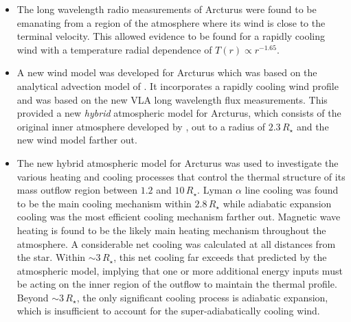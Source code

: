 \begin{itemize}
	\item The long wavelength radio measurements of Arcturus were found to be emanating from a region of the atmosphere where its wind is close to the terminal velocity. This allowed evidence to be found for a rapidly cooling wind with a temperature radial dependence of $T(r) \propto r^{-1.65}$.
	
	\item A new wind model was developed for Arcturus which was based on the analytical advection model of \cite{glassgold_1986}. It incorporates a rapidly cooling wind profile and was based on the new VLA long wavelength flux measurements. This provided a new \textit{hybrid} atmospheric model for Arcturus, which consists of the original inner atmosphere developed by \cite{drake_1985}, out to a radius of $2.3\,R_{\star}$ and the new wind model farther out.

	\item The new hybrid atmospheric model for Arcturus was used to investigate the various heating and cooling processes that control the thermal structure of its mass outflow region between $1.2$ and $10\,R_{\star}$. Lyman $\alpha$ line cooling was found to be the main cooling mechanism within $2.8\,R_{\star}$ while adiabatic expansion cooling was the most efficient cooling mechanism farther out. Magnetic wave heating is found to be the likely main heating mechanism throughout the atmosphere. A considerable net cooling was calculated at all distances from the star. Within $\sim 3\,R_{\star}$, this net cooling far exceeds that predicted by the atmospheric model, implying that one or more additional energy inputs must be acting on the inner region of the outflow to maintain the thermal profile. Beyond $\sim 3\,R_{\star}$, the only significant cooling process is adiabatic expansion, which is insufficient to account for the super-adiabatically cooling wind.

\end{itemize}

